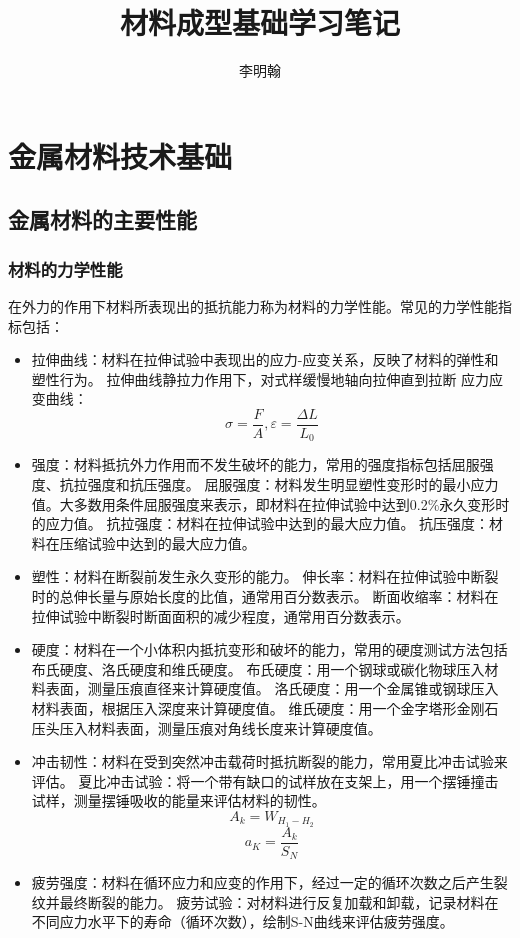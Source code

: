 \documentclass[12pt,a4paper]{article}
\title{材料成型基础学习笔记}
\author{李明翰}
\begin{document}
\maketitle
\newpage
\tableofcontents
\newpage
\section{金属材料技术基础}
\subsection{金属材料的主要性能}
\subsubsection{材料的力学性能}
在外力的作用下材料所表现出的抵抗能力称为材料的力学性能。常见的力学性能指标包括：
\begin{itemize}
  \item 拉伸曲线：材料在拉伸试验中表现出的应力-应变关系，反映了材料的弹性和塑性行为。
  \subitem 拉伸曲线静拉力作用下，对式样缓慢地轴向拉伸直到拉断
  \subitem 应力应变曲线：$$\sigma=\frac{F}{A},\varepsilon=\frac{\Delta L}{L_0} $$
  \item 强度：材料抵抗外力作用而不发生破坏的能力，常用的强度指标包括屈服强度、抗拉强度和抗压强度。
   \subitem 屈服强度：材料发生明显塑性变形时的最小应力值。大多数用条件屈服强度来表示，即材料在拉伸试验中达到0.2\%永久变形时的应力值。
   \subitem 抗拉强度：材料在拉伸试验中达到的最大应力值。
   \subitem 抗压强度：材料在压缩试验中达到的最大应力值。
  \item 塑性：材料在断裂前发生永久变形的能力。
  \subitem 伸长率：材料在拉伸试验中断裂时的总伸长量与原始长度的比值，通常用百分数表示。
  \subitem 断面收缩率：材料在拉伸试验中断裂时断面面积的减少程度，通常用百分数表示。
   \item 硬度：材料在一个小体积内抵抗变形和破坏的能力，常用的硬度测试方法包括布氏硬度、洛氏硬度和维氏硬度。
   \subitem 布氏硬度：用一个钢球或碳化物球压入材料表面，测量压痕直径来计算硬度值。
   \subitem 洛氏硬度：用一个金属锥或钢球压入材料表面，根据压入深度来计算硬度值。
   \subitem 维氏硬度：用一个金字塔形金刚石压头压入材料表面，测量压痕对角线长度来计算硬度值。
  \item 冲击韧性：材料在受到突然冲击载荷时抵抗断裂的能力，常用夏比冲击试验来评估。
   \subitem 夏比冲击试验：将一个带有缺口的试样放在支架上，用一个摆锤撞击试样，测量摆锤吸收的能量来评估材料的韧性。
   $$A_k=W_{H_1-H_2}$$
   $$a_K=\frac{A_k}{S_N}$$
  \item 疲劳强度：材料在循环应力和应变的作用下，经过一定的循环次数之后产生裂纹并最终断裂的能力。
   \subitem 疲劳试验：对材料进行反复加载和卸载，记录材料在不同应力水平下的寿命（循环次数），绘制S-N曲线来评估疲劳强度。
\end{itemize}
\end{document}
